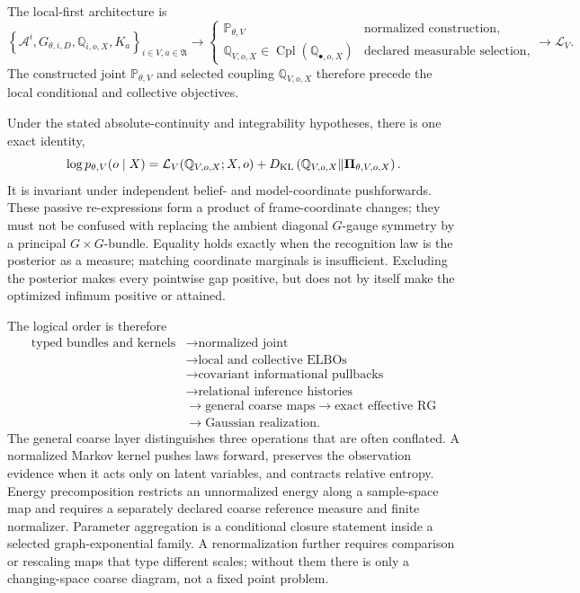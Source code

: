 The local-first architecture is
\begin{equation}
\left\{
\mathcal A^i,G_{\theta,i,D},\mathbb Q_{i,o,X},K_a
\right\}_{i\in V,a\in\mathfrak A}
\longrightarrow
\begin{cases}
\mathbb P_{\theta,V} & \text{normalized construction},\\
\mathbb Q_{V,o,X}\in\operatorname{Cpl}(\mathbb Q_{\bullet,o,X})
& \text{declared measurable selection},
\end{cases}
\longrightarrow
\mathcal L_V.
\label{eq:intro-local-to-global-architecture}
\end{equation}
The constructed joint \(\mathbb P_{\theta,V}\) and selected coupling
\(\mathbb Q_{V,o,X}\) therefore precede the local conditional and collective objectives.

Under the stated absolute-continuity and integrability hypotheses, there is one exact identity,
\begin{equation}
\log p_{\theta,V}(o\mid X)
=\mathcal L_V(\mathbb Q_{V,o,X};X,o)
+D_{\mathrm{KL}}\left(\mathbb Q_{V,o,X}\middle\Vert
\boldsymbol\Pi_{\theta,V,o,X}\right).
\label{eq:elbo-intro-identity}
\end{equation}
It is invariant under independent belief- and model-coordinate pushforwards.
These passive re-expressions form a product of frame-coordinate changes; they
must not be confused with replacing the ambient diagonal \(G\)-gauge symmetry
by a principal \(G\times G\)-bundle.  Equality
holds exactly when the recognition law is the posterior as a measure; matching
coordinate marginals is insufficient.  Excluding the posterior makes every
pointwise gap positive, but does not by itself make the optimized infimum
positive or attained. 

The logical order is therefore
\[
\begin{aligned}
\text{typed bundles and kernels}
&\longrightarrow \text{normalized joint}\\
&\longrightarrow \text{local and collective ELBOs}\\
&\longrightarrow \text{covariant informational pullbacks}\\
&\longrightarrow \text{relational inference histories}\\
&\longrightarrow \text{general coarse maps}
\longrightarrow \text{exact effective RG}\\
&\longrightarrow \text{Gaussian realization}.
\end{aligned}
\]
The general coarse layer distinguishes three operations that are often
conflated.  A normalized Markov kernel pushes laws forward, preserves the
observation evidence when it acts only on latent variables, and contracts
relative entropy.  Energy precomposition restricts an unnormalized energy
along a sample-space map and requires a separately declared coarse reference
measure and finite normalizer.  Parameter aggregation is a conditional
closure statement inside a selected graph-exponential family.  A
renormalization further requires comparison or rescaling maps that type
different scales; without them there is only a changing-space coarse diagram,
not a fixed point problem. 

